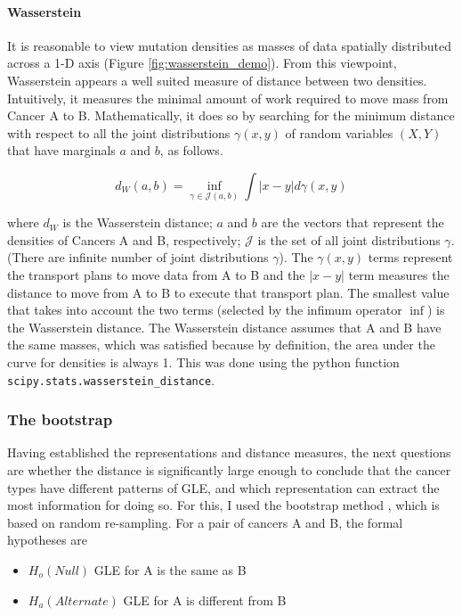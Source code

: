 \paragraph{Wasserstein} It is reasonable to view mutation densities as masses of data spatially distributed across a 1-D axis (Figure \ref{fig:wasserstein_demo}). From this viewpoint, Wasserstein appears a well suited measure of distance between two densities. Intuitively, it measures the minimal amount of work required to move mass from Cancer A to B. Mathematically, it does so by searching for the minimum distance with respect to all the joint distributions $\gamma(x,y)$ of random variables $(X,Y)$ that have \glspl{marginal} $a$ and $b$, as follows.

\begin{equation}
    d_W(a,b) = \underset{\gamma \in \mathcal{J}(a,b)}{\inf} \int |x-y| d \gamma(x,y) 
    \label{eq:wassertein}
\end{equation}

where $d_W$ is the Wasserstein distance; $a$ and $b$ are the vectors that represent the densities of Cancers A and B, respectively; $\mathcal{J}$ is the set of all joint distributions $\gamma$. (There are infinite number of joint distributions $\gamma$). The $\gamma(x,y)$ terms represent the transport plans to move data from A to B and the $|x-y|$ term measures the distance to move from A to B to execute that transport plan. The smallest value that takes into account the two terms (selected by the infimum operator $\inf$) is the Wasserstein distance. The Wasserstein distance assumes that A and B have the same masses, which was satisfied because by definition, the area under the curve for densities is always 1. This was done using the python function \texttt{scipy.stats.wasserstein\_distance}.


\subsubsection{The bootstrap}

Having established the representations and distance measures, the next questions are whether the distance is significantly large enough to conclude that the cancer types have different patterns of GLE, and which representation can extract the most information for doing so. For this, I used the bootstrap method \citep{Singh2010BootstrapMethod}, which is based on random re-sampling. For a pair of cancers A and B, the formal hypotheses are

\begin{itemize}
    \item $H_o (Null)$ GLE for A is the same as B
    \item $H_a (Alternate)$ GLE for A is different from B
\end{itemize}

